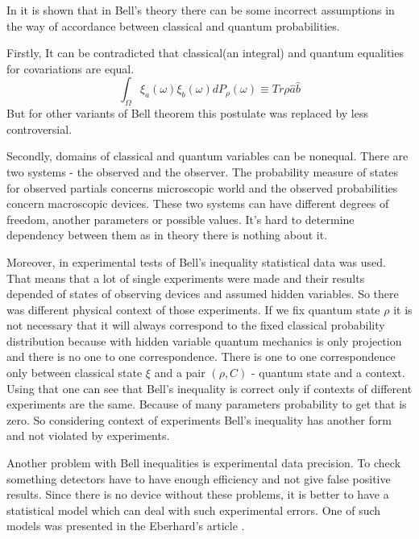 \documentclass[11pt]{article}
\begin{document}
In \cite{Khrennikov_information} it is shown that in Bell's theory there can be some incorrect assumptions in the way of accordance between classical and quantum probabilities.

Firstly, It can be contradicted that classical(an integral) and quantum equalities for covariations are equal.
$$\int_\Omega\xi_a(\omega)\xi_b(\omega)dP_\rho(\omega) \equiv Tr\rho\hat{a}\hat{b}$$
But for other variants of Bell theorem this postulate was replaced by less controversial.

Secondly, domains of classical and quantum variables can be nonequal. There are two systems - the observed and the observer. The probability measure of states for observed partials concerns microscopic world and the observed probabilities concern macroscopic devices. These two systems can have different degrees of freedom, another parameters or possible values. It's hard to determine dependency between them as in theory there is nothing about it.

Moreover, in experimental tests of Bell's inequality statistical data was used. That means that a lot of single experiments were made and their results depended of states of observing devices and assumed hidden variables. So there was different physical context of those experiments. If we fix quantum state $\rho$ it is not necessary that it will always correspond to the fixed classical probability distribution because with hidden variable quantum mechanics is only projection and there is no one to one correspondence. There is one to one correspondence only between classical state $\xi$ and a pair $(\rho, C)$ - quantum state and a context. Using that one can see that Bell's inequality is correct only if contexts of different experiments are the same. Because of many parameters probability to get that is zero. So considering context of experiments Bell's inequality has another form and not violated by experiments.

Another problem with Bell inequalities is experimental data precision. To check something detectors have to have enough efficiency and not give false positive results. Since there is no device without these problems, it is better to have a statistical model which can deal with such experimental errors. One of such models was presented in the Eberhard's article \cite{Eberhard}.
\end{document}
